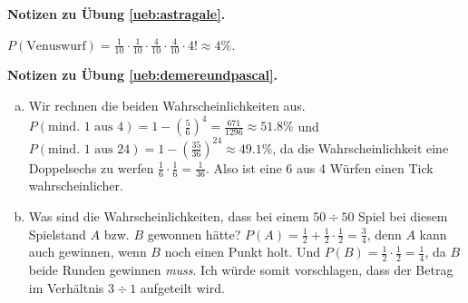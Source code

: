 \documentclass[%
11pt,%
twoside,%
titlepage,%
german,%
headsepline%
]{scrartcl}
\newcommand{\concatueb}[1]{ueb:#1}%
\newcommand{\concatlsg}[1]{lsg:#1}%
\newenvironment{lsg}[1]{%
    \par\noindent\textbf{Notizen zu Übung \ref{\concatueb{#1}}.}%
    \label{\concatlsg{#1}}
}{%
    \par%
}
\begin{document}
 
 \begin{lsg}{astragale}
$P(\text{Venuswurf})=\frac{1}{10}\cdot\frac{1}{10}\cdot\frac{4}{10}\cdot\frac{4}{10}\cdot4!\approx4\%$.
 \end{lsg}


\begin{lsg}{demereundpascal}
\begin{enumerate}[a)]
\item Wir rechnen die beiden Wahrscheinlichkeiten aus. $P(\text{mind. 1 aus 4})=1-\left(\frac{5}{6}\right)^{4}=\frac{671}{1296}\approx51.8\%$ und $P(\text{mind. 1 aus 24})=1-\left(\frac{35}{36}\right)^{24}\approx49.1\%$, da die Wahrscheinlichkeit eine Doppelsechs zu werfen $\frac{1}{6}\cdot\frac{1}{6}=\frac{1}{36}$. Also ist eine 6 aus 4 W\"urfen einen Tick wahrscheinlicher.
\item Was sind die Wahrscheinlichkeiten, dass bei einem $50\div50$ Spiel bei diesem Spielstand $A$ bzw. $B$ gewonnen h\"atte? $P(A)=\frac{1}{2}+\frac{1}{2}\cdot\frac{1}{2}=\frac{3}{4}$, denn $A$ kann auch gewinnen, wenn $B$ noch einen Punkt holt. Und $P(B)=\frac{1}{2}\cdot\frac{1}{2}=\frac{1}{4}$, da $B$ beide Runden gewinnen \emph{muss}. Ich w\"urde somit vorschlagen, dass der Betrag im Verh\"altnis $3\div1$ aufgeteilt wird.
\end{enumerate}
\end{lsg}
\end{document}
